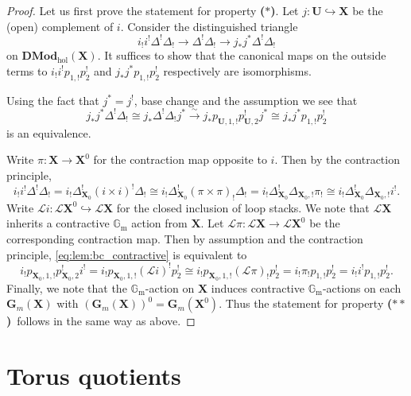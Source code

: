 \documentclass{oupau}
\theoremstyle{remark}
\newcommand\Gm{\mathbb{G}_{\mathrm{m}}}     %
\let\stack\mathbf                           %
\newcommand\cat{\mathbf}                    %
\newcommand\isoto{\xrightarrow{\sim}}       %
\newcommand\catDMod[2][]{\cat{DMod}_{#1}(#2)}   %
\newcommand\catDModHol[1]{\catDMod[\mathrm{hol}]{#1}}   %
\newcommand\bc{\textbf{($\mathbf{*}$)}}
\newcommand\hbc{\textbf{($\mathbf{**}$)}}
\newcommand\ls[1]{\mathcal{L} #1}
\begin{document}
\begin{proof}
    Let us first prove the statement for property \bc.
    Let $j\colon \stack U \hookrightarrow \stack X$ be the (open) complement of $i$.
    Consider the distinguished triangle
    \[
        i_!i^! \Delta^!\Delta_! \to \Delta^!\Delta_! \to j_*j^*\Delta^!\Delta_!
    \]
    on $\catDModHol{\stack X}$.
    It suffices to show that the canonical maps on the outside terms to $i_!i^! p_{1,!}p_2^!$ and $j_*j^* p_{1,!}p_2^!$ respectively are isomorphisms.
    
    Using the fact that $j^* = j^!$, base change and the assumption we see that
    \[
        j_*j^*\Delta^!\Delta_! \cong
        j_*\Delta^!\Delta_!j^* \isoto
        j_*p_{\stack U,1,!}p_{\stack U,2}^! j^* \cong
        j_*j^* p_{1,!}p_2^!
    \]
    is an equivalence.

    Write $\pi\colon \stack X \to \stack X^0$ for the contraction map opposite to $i$.
    Then by the contraction principle,
    \begin{equation}\label{eq:lem:bc_contractive}
        i_!i^! \Delta^!\Delta_! =
        i_!\Delta_{\stack X_0}^!(i\times i)^! \Delta_! \cong
        i_!\Delta_{\stack X_0}^!(\pi\times \pi)_! \Delta_! =
        i_!\Delta_{\stack X_0}^!\Delta_{\stack X_0,!} \pi_! \cong
        i_!\Delta_{\stack X_0}^!\Delta_{\stack X_0,!} i^!.
    \end{equation}
    Write $\ls i \colon \ls\stack X^0 \hookrightarrow \ls\stack X$ for the closed inclusion of loop stacks.
    We note that $\ls\stack X$ inherits a contractive $\Gm$ action from $\stack X$.
    Let $\ls \pi\colon \ls\stack X \to \ls\stack X^0$ be the corresponding contraction map.
    Then by assumption and the contraction principle, \eqref{eq:lem:bc_contractive} is equivalent to
    \[
        i_!p_{\stack X_0,1,!}p_{\stack X_0,2}^! i^! =
        i_!p_{\stack X_0,1,!} (\ls i)^! p_{2}^! \cong
        i_!p_{\stack X_0,1,!} (\ls \pi)_! p_{2}^! =
        i_! \pi_! p_{1,!} p_{2}^! =
        i_! i^! p_{1,!} p_{2}^!.
    \]
    Finally, we note that the $\Gm$-action on $\stack X$ induces contractive $\Gm$-actions on each $\stack G_m(\stack X)$ with $(\stack G_m(\stack X))^0 = \stack G_m(\stack X^0)$.
    Thus the statement for property \hbc\ follows in the same way as above.
\end{proof}

\section{Torus quotients}\label{sec:torus}
\end{document}
